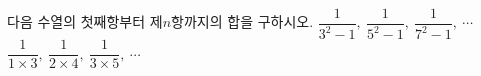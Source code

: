 다음 수열의 첫째항부터 제$n$항까지의 합을 구하시오.
 $\dfrac{1}{3^2-1},\ \dfrac{1}{5^2-1},\ \dfrac{1}{7^2-1},\ \cdots$
 $\dfrac{1}{1\times3},\ \dfrac{1}{2\times4},\ \dfrac{1}{3\times5},\ \cdots$
